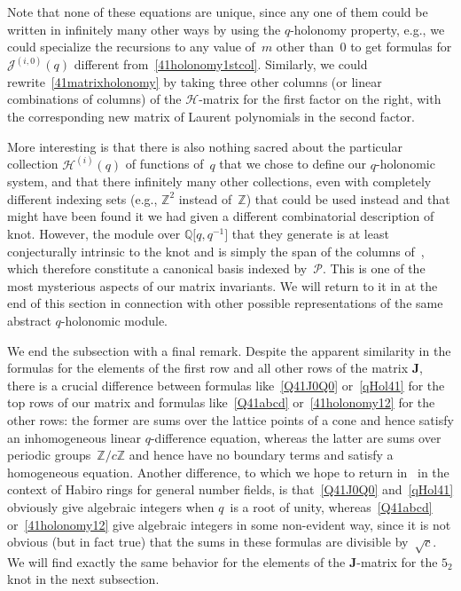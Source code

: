 \documentclass[pdftex]{sigma}
\numberwithin{equation}{section}
\def\BZ{\mathbb Z}
\def\calP{\mathcal P}
\def\calP{\mathcal P}
\def\Z{\mathbb Z}
\def\Q{\mathbb Q}
\def\i{^{-1}}
\def\bJ{J} \def\bJ{\mathbf{J}}
\def\sJ{\mathcal{J}}
\def\sH{\mathcal H} %
\begin{document}
Note that none of these equations are unique, since any one of them could be written
in infinitely many other ways by using the $q$-holonomy property, e.g., we could
specialize the recursions to any value of~$m$ other than~0 to get formulas for
$\sJ^{(i,0)}(q)$ different from~\eqref{41holonomy1stcol}. Similarly, we could
rewrite~\eqref{41matrixholonomy} by taking three other columns (or linear combinations
of columns) of the $\sH$-matrix for the first factor on the right, with the
corresponding new matrix of Laurent polynomials in the second factor.

More interesting is that there is also nothing sacred about the particular collection
$\sH^{(i)}(q)$ of functions of~$q$ that we chose to define our $q$-holonomic system,
and that there infinitely many other collections, even with completely different
indexing sets (e.g., $\Z^2$ instead of~$\Z$) that could be used instead and that might
have been found it we had given a different combinatorial description of knot. However,
the module over $\Q\big[q,q\i\big]$ that they generate is at least conjecturally intrinsic to
the knot and is simply the span of the columns of~\smash{$\bJ^{(K)}$}, which therefore
constitute a canonical basis indexed by~$\calP$. This is one of the most mysterious
aspects of our matrix invariants. We will return to it in at the end of this section
in connection with other possible representations of the same abstract $q$-holonomic
module.

We end the subsection with a final remark. Despite the apparent similarity in the
formulas for the elements of the first row and all other rows of the matrix $\bJ$,
there is a crucial difference between formulas like~\eqref{Q41J0Q0} or~\eqref{qHol41}
for the top rows of our matrix and formulas like~\eqref{Q41abcd}
or~\eqref{41holonomy12}
for the other rows: the former are sums over the lattice points of a cone and
hence satisfy an inhomogeneous linear $q$-difference equation, whereas the latter
are sums over periodic groups~$\BZ/c\BZ$ and hence have no boundary terms and
satisfy a homogeneous equation. Another difference, to which we hope to return
in~\cite{GSZ:habiro} in the context of Habiro rings for general number fields, is
that~\eqref{Q41J0Q0} and~\eqref{qHol41} obviously give algebraic integers when $q$~is
a root of unity, whereas~\eqref{Q41abcd} or~\eqref{41holonomy12} give algebraic
integers in some non-evident way, since it is not obvious (but in fact true)
that the sums in these formulas are divisible by~$\sqrt c$. We will find
exactly the same behavior for the elements of the $\bJ$-matrix for the $5_2$ knot
in the next subsection.
\end{document}
